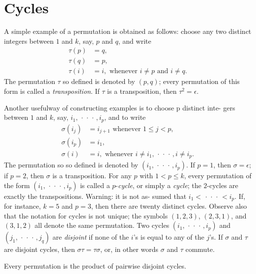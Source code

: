 \section{Cycles}

A simple example of a permutation is obtained as follows: choose any two distinct integers between \(1\) and \(k\), say, \(p\) and \(q\), and write
\begin{align*}
    \tau(p) & = q, \\
    \tau(q) & = p, \\
    \tau(i) & = i, \text{ whenever } i \neq p \text{ and } i \neq q.
\end{align*}
The permutation \(\tau\) so defined is denoted by \((p, q)\); every permutation of this form is called a \emph{transposition}. If \(\tau\) is a transposition, then \(\tau^2 = \epsilon\).

Another usefulway of constructing examples is to choose p distinct inte- gers between \(1\) and \(k\), say, \(i_1, \,\cdot\,\cdot\,\cdot\,, i_p\), and to write
\begin{align*}
    \sigma(i_j) &= i_{j+1}\text{ whenever } 1 \leq j < p, \\
    \sigma(i_p) &= i_1,\\
    \sigma(i) &= i, \text{ whenever } i \neq i_1, \,\cdot\,\cdot\,\cdot\,, i \neq i_p.
\end{align*}
The permutation so so defined is denoted by \((i_1, \,\cdot\,\cdot\,\cdot\,,
i_p)\). If \(p = 1\), then \(\sigma = \epsilon\); if \(p = 2\), then \(\sigma\)
is a transposition. For any \(p\) with \(1 < p \leq k\), every permutation of
the form \((i_1, \,\cdot\,\cdot\,\cdot\,, i_p)\) is called a \(p\)-\emph{cycle},
or simply a \emph{cycle}; the \(2\)-cycles are exactly the transpositions.
Warning: it is not as- sumed that \(i_1 < \,\cdot\,\cdot\,\cdot\, < i_p\). If,
for instance, \(k = 5\) and \(p = 3\), then there are twenty distinct cycles.
Observe also that the notation for cycles is not unique; the symbols \((1, 2,
3)\), \((2, 3, 1)\), and \((3, 1, 2)\) all denote the same permutation. Two
cycles \((i_1, \,\cdot\,\cdot\,\cdot\,, i_p)\) and \((j_1,
\,\cdot\,\cdot\,\cdot\,, j_q)\) are \emph{disjoint} if none of the \(i\)'s is
equal to any of the \(j\)'s. If \(\sigma\) and \(\tau\) are disjoint cycles,
then \(\sigma\tau = \tau\sigma\), or, in other words \(\sigma\) and \(\tau\)
commute.

\begin{theorem}
    Every permutation is the product of pairwise disjoint cycles.
\end{theorem}

